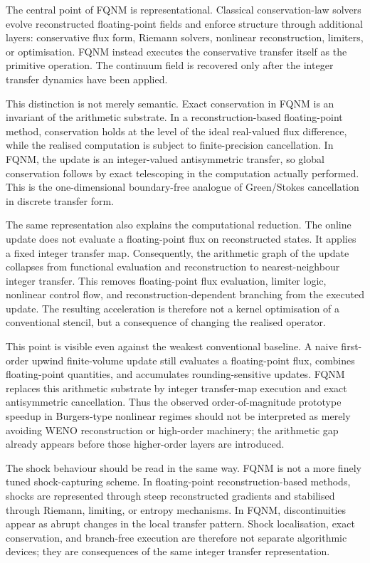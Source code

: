 \documentclass[sn-basic]{sn-jnl}
\theoremstyle{plain}
\theoremstyle{remark}
\begin{document}
The central point of FQNM is representational. Classical conservation-law solvers evolve reconstructed floating-point fields and enforce structure through additional layers: conservative flux form, Riemann solvers, nonlinear reconstruction, limiters, or optimisation. FQNM instead executes the conservative transfer itself as the primitive operation. The continuum field is recovered only after the integer transfer dynamics have been applied.

This distinction is not merely semantic. Exact conservation in FQNM is an invariant of the arithmetic substrate. In a reconstruction-based floating-point method, conservation holds at the level of the ideal real-valued flux difference, while the realised computation is subject to finite-precision cancellation. In FQNM, the update is an integer-valued antisymmetric transfer, so global conservation follows by exact telescoping in the computation actually performed. This is the one-dimensional boundary-free analogue of Green/Stokes cancellation in discrete transfer form.

The same representation also explains the computational reduction. The online update does not evaluate a floating-point flux on reconstructed states. It applies a fixed integer transfer map. Consequently, the arithmetic graph of the update collapses from functional evaluation and reconstruction to nearest-neighbour integer transfer. This removes floating-point flux evaluation, limiter logic, nonlinear control flow, and reconstruction-dependent branching from the executed update. The resulting acceleration is therefore not a kernel optimisation of a conventional stencil, but a consequence of changing the realised operator.

This point is visible even against the weakest conventional baseline. A naive first-order upwind finite-volume update still evaluates a floating-point flux, combines floating-point quantities, and accumulates rounding-sensitive updates. FQNM replaces this arithmetic substrate by integer transfer-map execution and exact antisymmetric cancellation. Thus the observed order-of-magnitude prototype speedup in Burgers-type nonlinear regimes should not be interpreted as merely avoiding WENO reconstruction or high-order machinery; the arithmetic gap already appears before those higher-order layers are introduced.

The shock behaviour should be read in the same way. FQNM is not a more finely tuned shock-capturing scheme. In floating-point reconstruction-based methods, shocks are represented through steep reconstructed gradients and stabilised through Riemann, limiting, or entropy mechanisms. In FQNM, discontinuities appear as abrupt changes in the local transfer pattern. Shock localisation, exact conservation, and branch-free execution are therefore not separate algorithmic devices; they are consequences of the same integer transfer representation.
\end{document}
